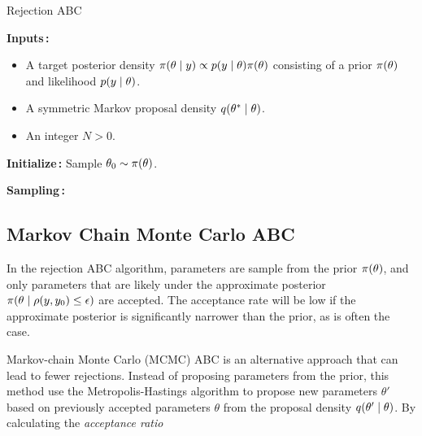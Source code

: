 \begin{algorithm}[H]
\caption{Rejection ABC}
\label{alg:mcmcabc}
\SetAlgoLined
\DontPrintSemicolon
 \textbf{Inputs\,:}\;
 \vspace{-5mm}
 \begin{itemize}
     \item A target posterior density $\pi \qty(\theta \mid y) \propto p \qty(y \mid \theta) \pi \qty(\theta)$ consisting of a prior $\pi \qty(\theta)$ and likelihood $p \qty(y \mid \theta)$. 
     \item A symmetric Markov proposal density $q \qty(\theta^* \mid \theta)$.
     \item An integer $N>0$.
 \end{itemize}
 
 \vspace{5mm}
 \textbf{Initialize\,:}\;
 Sample $\theta_0 \sim \pi \qty(\theta)$.\;

 \vspace{5mm}
 \textbf{Sampling\,:}\;
\end{algorithm}


\subsection{Markov Chain Monte Carlo ABC}\label{sec:mcmc_abc}

In the rejection ABC algorithm, parameters are sample from the prior $\pi \qty(\theta)$, and only parameters that are likely under the approximate posterior $\pi \qty(\theta \mid \rho \qty(y, y_0 ) \leq \epsilon )$ are accepted. The acceptance rate will be low if the approximate posterior is significantly narrower than the prior, as is often the case. %

Markov-chain Monte Carlo (MCMC) ABC is an alternative approach that can lead to fewer rejections. Instead of proposing parameters from the prior, this method use the Metropolis-Hastings algorithm to propose new parameters $\theta'$ based on previously accepted parameters $\theta$ from the proposal density $q \qty(\theta' \mid \theta)$. By calculating the \textit{acceptance ratio}

